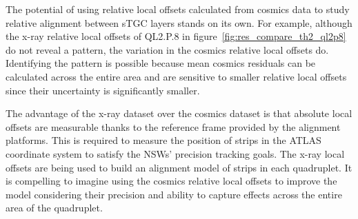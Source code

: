 The potential of using relative local offsets calculated from cosmics data to study relative alignment between sTGC layers stands on its own. For example, although the x-ray relative local offsets of QL2.P.8 in figure~\ref{fig:res_compare_th2_ql2p8} do not reveal a pattern, the variation in the cosmics relative local offsets do. Identifying the pattern is possible because mean cosmics residuals can be calculated across the entire area and are sensitive to smaller relative local offsets since their uncertainty is significantly smaller. 

The advantage of the x-ray dataset over the cosmics dataset is that absolute local offsets are measurable thanks to the reference frame provided by the alignment platforms. This is required to measure the position of strips in the ATLAS coordinate system to satisfy the NSWs' precision tracking goals. The x-ray local offsets are being used to build an alignment model of strips in each quadruplet. It is compelling to imagine using the cosmics relative local offsets to improve the model considering their precision and ability to capture effects across the entire area of the quadruplet.